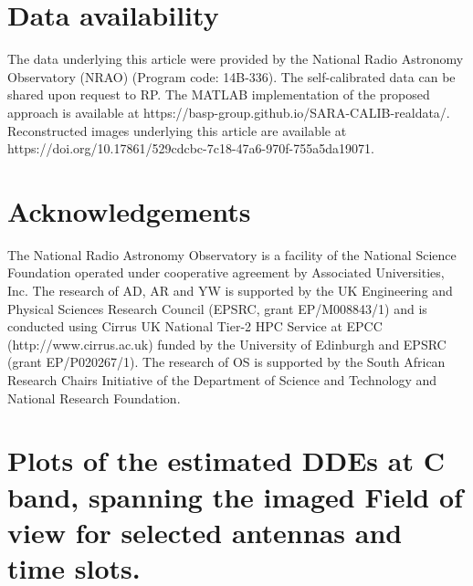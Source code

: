 \documentclass[fleqn,usenatbib]{mnras}
\begin{document}
\section{Data availability}
 The data underlying this article were provided by the National Radio Astronomy Observatory (NRAO) (Program code: 14B-336). The self-calibrated data can be shared upon request to RP. The MATLAB implementation of the proposed approach is available at https://basp-group.github.io/SARA-CALIB-realdata/.
Reconstructed images underlying this article are available at {https://doi.org/10.17861/529cdcbc-7c18-47a6-970f-755a5da19071}.
\section*{Acknowledgements}
The National Radio Astronomy Observatory is a facility of the National Science Foundation operated under cooperative agreement by Associated Universities, Inc. The research of AD, AR and YW is supported by the UK Engineering and Physical Sciences Research Council (EPSRC, grant EP/M008843/1) and is conducted using Cirrus UK National Tier-2 HPC Service at EPCC ({http://www.cirrus.ac.uk}) funded by the University of Edinburgh and EPSRC (grant EP/P020267/1). The research of OS is supported by the South African Research Chairs Initiative of the Department of Science and Technology and National Research Foundation. 











\appendix
\section{Plots of the estimated DDEs at C band, spanning the imaged Field of view for selected antennas and time slots.}







\bsp	%
\label{lastpage}
\end{document}
